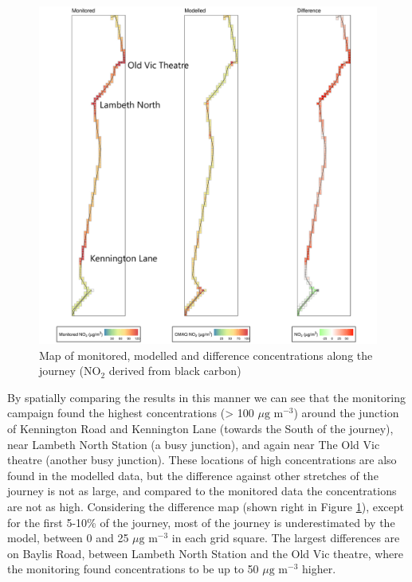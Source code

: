 \begin{figure}[H]
\centering
\includegraphics[scale=0.17]{images/monitored_modelled_summary.png}
\caption{Map of monitored, modelled and difference concentrations along the journey (NO$_{2}$ derived from black carbon)}
\label{fig:monitored_modelled_summary}
\end{figure}

By spatially comparing the results in this manner we can see that the monitoring campaign found the highest concentrations (> 100 $\mu \text{g m}^{-3}$) around the junction of Kennington Road and Kennington Lane (towards the South of the journey), near Lambeth North Station (a busy junction), and again near The Old Vic theatre (another busy junction). These locations of high concentrations are also found in the modelled data, but the difference against other stretches of the journey is not as large, and compared to the monitored data the concentrations are not as high. Considering the difference map (shown right in Figure \ref{fig:monitored_modelled_summary}), except for the first 5-10\% of the journey, most of the journey is underestimated by the model, between 0 and 25 $\mu \text{g m}^{-3}$ in each grid square. The largest differences are on Baylis Road, between Lambeth North Station and the Old Vic theatre, where the monitoring found concentrations to be up to 50 $\mu \text{g m}^{-3}$ higher. 

